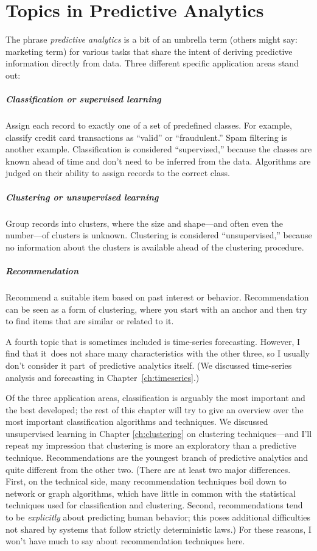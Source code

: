 \section{Topics in Predictive Analytics}

The phrase \emph{predictive analytics} is a bit of an umbrella term
(others might say: marketing term) for various tasks that share the
intent of deriving predictive information directly from data. Three
different specific application areas stand out:
\begin{unnumlist}
\subparagraph{Classification or supervised learning}
\item Assign each record to
  exactly one of a set of predefined classes. For example, classify
  credit card transactions as ``valid'' or ``fraudulent.'' Spam
  filtering is another example. Classification is considered
  ``supervised,'' because the classes are known ahead of time and
  don't need to be inferred from the data.  Algorithms are judged on
  their ability to assign records to the correct class.
\subparagraph{Clustering or unsupervised learning}  
\item Group records into
  clusters, where the size and shape---and often even the number---of
  clusters is unknown. Clustering is considered ``unsupervised,''
  because no information about the clusters is available ahead of the
  clustering procedure.
\subparagraph{Recommendation}  
\item Recommend a suitable item based on past
  interest or behavior. Recommendation can be seen as a form of
  clustering, where you start with an anchor and then try to find
  items that are similar or related to it.
\end{unnumlist}

A fourth topic that is sometimes included is time-series forecasting.
However, I find that it~does not share many characteristics with the
other three, so I usually don't consider it part~of predictive
analytics itself. (We discussed time-series analysis and forecasting
in Chapter~\ref{ch:timeseries}.)

Of the three application areas, classification is arguably the most
important and the best developed; the rest of this chapter will try to
give an overview over the most important classification algorithms and
techniques. We discussed unsupervised learning in Chapter
\ref{ch:clustering} on clustering techniques---and I'll repeat my
impression that clustering is more an exploratory than a predictive
technique.  Recommendations are the youngest branch of predictive
analytics and quite different from the other two. (There are at least
two major differences. First, on the technical side, many
recommendation techniques boil down to network or graph algorithms,
which have little in common with the statistical techniques used for
classification and clustering. Second, recommendations tend to be
\emph{explicitly} about predicting human behavior; this poses
additional difficulties not shared by systems that follow strictly
deterministic laws.) For these reasons, I won't have much to say about
recommendation techniques here.

